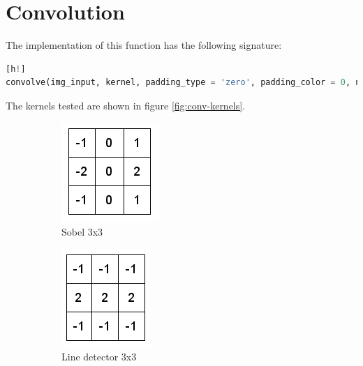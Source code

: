 \section{Convolution}

The implementation of this function has the following signature:

\begin{lstlisting}[language=python][h!]
convolve(img_input, kernel, padding_type = 'zero', padding_color = 0, normalize = False):
\end{lstlisting}

The kernels tested are shown in figure \ref{fig:conv-kernels}.
 
\begin{figure}[h!]
\centering
\begin{subfigure}{0.3\textwidth}
  \centering
  \includegraphics[width=0.5\linewidth]{figs/sobel.png}
  \caption{Sobel 3x3}
\end{subfigure}%
\begin{subfigure}{0.3\textwidth}
  \centering
  \includegraphics[width=0.5\linewidth]{figs/line.png}
  \caption{Line detector 3x3}
\end{subfigure}%
\begin{subfigure}{0.3\textwidth}

\end{subfigure}
\end{figure}
